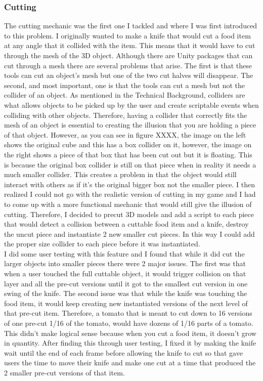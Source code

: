 \documentclass[10pt,twocolumn]{article}
\begin{document}
\subsubsection{Cutting}
The cutting mechanic was the first one I tackled and where I was first introduced to this problem. I originally wanted to make a knife that would cut a food item at any angle that it collided with the item. This means that it would have to cut through the mesh of the 3D object. Although there are Unity packages that can cut through a mesh there are several problems that arise. The first is that these tools can cut an object's mesh but one of the two cut halves will disappear. The second, and most important, one is that the tools can cut a mesh but not the collider of an object. As mentioned in the Technical Background, colliders are what allows objects to be picked up by the user and create scriptable events when colliding with other objects. Therefore, having a collider that correctly fits the mesh of an object is essential to creating the illusion that you are holding a piece of that object. However, as you can see in figure XXXX, the image on the left shows the original cube and this has a box collider on it, however, the image on the right shows a piece of that box that has been cut out but it is floating. This is because the original box collider is still on that piece when in reality it needs a much smaller collider. This creates a problem in that the object would still interact with others as if it’s the original bigger box not the smaller piece. I then realized I could not go with the realistic version of cutting in my game and I had to come up with a more functional mechanic that would still give the illusion of cutting. Therefore, I decided to precut 3D models and add a script to each piece that would detect a collision between a cuttable food item and a knife, destroy the uncut piece and instantiate 2 new smaller cut pieces. In this way I could add the proper size collider to each piece before it was instantiated.
\\
I did some user testing with this feature and I found that while it did cut the larger objects into smaller pieces there were 2 major issues. The first was that when a user touched the full cuttable object, it would trigger collision on that layer and all the pre-cut versions until it got to the smallest cut version in one swing of the knife. The second issue was that while the knife was touching the food item, it would keep creating new instantiated versions of the next level of that pre-cut item. Therefore, a tomato that is meant to cut down to 16 versions of one pre-cut 1/16 of the tomato, would have dozens of 1/16 parts of a tomato. This didn’t make logical sense because when you cut a food item, it doesn’t grow in quantity. After finding this through user testing, I fixed it by making the knife wait until the end of each frame before allowing the knife to cut so that gave users the time to move their knife and make one cut at a time that produced the 2 smaller pre-cut versions of that item. 
\end{document}
